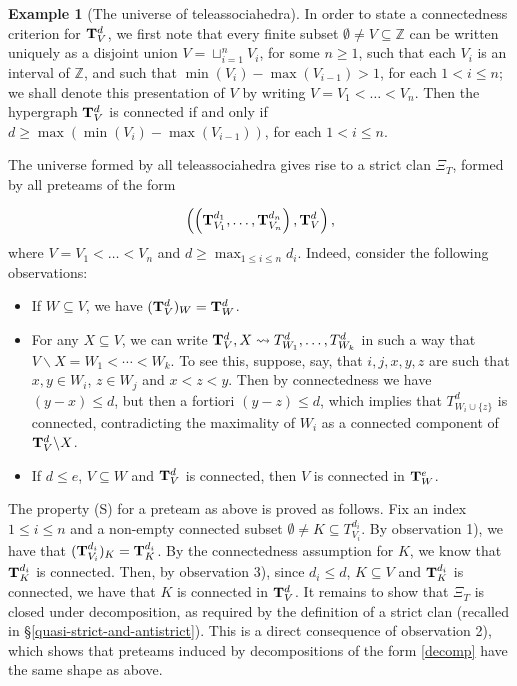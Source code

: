 \documentclass{article}
\theoremstyle{plain}
\theoremstyle{definition}
\newtheorem{example}[thm]{\sc Example}
\newcommand{\inc}{\subseteq}
\newcommand{\set}[1]{\{#1\}}
\newcommand{\hyper}[1]{{\bf #1}}
\begin{document}
\begin{example}[The universe of teleassociahedra]
 In order to state a connectedness criterion for $\hyper{T}^d_V$, we first note that every finite subset $\emptyset \neq V\subseteq \mathbb{Z}$ can be written uniquely as a disjoint union  $V=\sqcup_{i=1}^n V_i$, for some $n \geq 1$, such that  each $V_i$  is an interval of $\mathbb{Z}$,
 and such that $\min(V_i)-\max(V_{i-1})>1$, for each $1 < i \leq n$; we shall denote this presentation of $V$ by writing $V=V_1 <\ldots < V_n$. Then the hypergraph  $\hyper{T}^d_V$ is connected if and only if $d\geq\max(\min(V_i)-\max(V_{i-1}))$, for each $1 < i \leq n$.     

\smallskip

The universe formed by all  teleassociahedra gives rise to a strict clan $\Xi_T$, formed by all preteams of the form 

$$\left(\left( \hyper{T}^{d_1}_{V_1}, \ldots, \hyper{T}^{d_n}_{V_n} \right), \hyper{T}^d_V\right),$$ where $V= V_1 <\ldots < V_n$ and $d \geq \max_{1\leq i \leq n} d_i$.
Indeed, consider the following observations:
\begin{itemize}
\item[1)] If $W\inc V$, we have $(\hyper{T}^d_V)_W=\hyper{T}^d_W$.
\item[2)] For any $X\inc V$, we can write $\hyper{T}^d_V, X\leadsto T_{W_1}^d,\ldots,T_{W_k}^d$ in such a way that
$V\backslash X=W_1 < \cdots < W_k$.  To see this, suppose, say, that $i,j,x,y,z$ are such that  $x,y\in W_i$, $z\in W_j$ and
$x<z<y$. Then by connectedness we have $(y-x)\leq d$, but then a fortiori $(y-z)\leq d$, which implies that
$T_{W_i\cup\set{z}}^d$ is connected, contradicting the maximality of $W_i$ as a connected component of $\hyper{T}^d_V\backslash X$.
\item[3)] If $d\leq e$, $V\inc W$ and $\hyper{T}^d_V$ is connected, then $V$ is connected in $\hyper{T}^e_W$.
\end{itemize}
 The property (S) for a preteam as above is proved as follows. Fix an index $1\leq i\leq n$ and a non-empty connected subset $\emptyset \neq K\subseteq T^{d_i}_{V_i}$. By observation 1), we have that $(\hyper{T}^{d_i}_{V_i})_K=\hyper{T}^{d_i}_K$. By the connectedness assumption for $K$, we know  that $\hyper{T}^{d_i}_K$ is connected. 
 Then, by observation 3), since $d_i\leq d$, $K\subseteq V$ and ${\bf T}^{d_i}_{K}$ is connected, we have that $K$ is connected in $\hyper{T}^d_V$. It remains to show that
$\Xi_T$ is closed under decomposition, as required by the definition of a strict clan (recalled in \S\ref{quasi-strict-and-antistrict}). This is a direct consequence of  observation 2), which shows that preteams induced by decompositions of the form \eqref{decomp} have the same shape as above.


\end{example}
\end{document}
